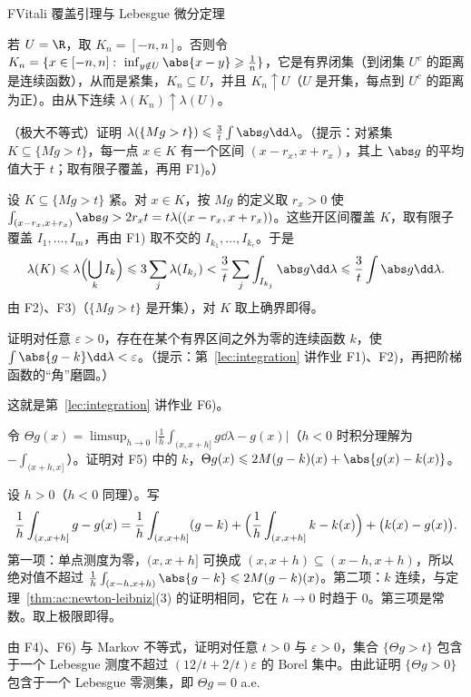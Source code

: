 \begin{probleme}{F}{Vitali 覆盖引理与 Lebesgue 微分定理}
\begin{questions}
\begin{solution}
若 $U=\R$，取 $K_n=[-n,n]$。否则令 $K_n=\{x\in[-n,n]:\ \inf_{y\notin U}\abs{x-y}\geqslant\frac1n\}$，它是有界闭集（到闭集 $U^c$ 的距离是连续函数），从而是紧集，$K_n\subseteq U$，并且 $K_n\uparrow U$（$U$ 是开集，每点到 $U^c$ 的距离为正）。由从下连续 $\lambda(K_n)\uparrow\lambda(U)$。
\end{solution}
\item （极大不等式）证明 $\lambda(\{Mg>t\})\leqslant\frac3t\int\abs g\dd\lambda$。（提示：对紧集 $K\subseteq\{Mg>t\}$，每一点 $x\in K$ 有一个区间 $(x-r_x,x+r_x)$，其上 $\abs g$ 的平均值大于 $t$；取有限子覆盖，再用 F1)。）
\begin{solution}
设 $K\subseteq\{Mg>t\}$ 紧。对 $x\in K$，按 $Mg$ 的定义取 $r_x>0$ 使 $\int_{(x-r_x,x+r_x)}\abs g>2r_xt=t\lambda((x-r_x,x+r_x))$。这些开区间覆盖 $K$，取有限子覆盖 $I_1,\dots,I_m$，再由 F1) 取不交的 $I_{k_1},\dots,I_{k_r}$。于是
\[
\lambda(K)\leqslant\lambda\Bigl(\bigcup_kI_k\Bigr)\leqslant3\sum_j\lambda(I_{k_j})<\frac3t\sum_j\int_{I_{k_j}}\abs g\dd\lambda\leqslant\frac3t\int\abs g\dd\lambda .
\]
由 F2)、F3)（$\{Mg>t\}$ 是开集），对 $K$ 取上确界即得。
\end{solution}
\item 证明对任意 $\varepsilon>0$，存在在某个有界区间之外为零的连续函数 $k$，使 $\int\abs{g-k}\dd\lambda<\varepsilon$。（提示：第~\ref{lec:integration} 讲作业 F1)、F2)，再把阶梯函数的“角”磨圆。）
\begin{solution}
这就是第~\ref{lec:integration} 讲作业 F6)。
\end{solution}
\item 令 $\Theta g(x)=\limsup_{h\to0}\bigl|\frac1h\int_{(x,x+h]}g\dd\lambda-g(x)\bigr|$（$h<0$ 时积分理解为 $-\int_{(x+h,x]}$）。证明对 F5) 中的 $k$，$\Theta g(x)\leqslant2M(g-k)(x)+\abs{g(x)-k(x)}$。
\begin{solution}
设 $h>0$（$h<0$ 同理）。写
\[
\frac1h\int_{(x,x+h]}g-g(x)=\frac1h\int_{(x,x+h]}(g-k)+\Bigl(\frac1h\int_{(x,x+h]}k-k(x)\Bigr)+\bigl(k(x)-g(x)\bigr).
\]
第一项：单点测度为零，$(x,x+h]$ 可换成 $(x,x+h)\subseteq(x-h,x+h)$，所以绝对值不超过 $\frac1h\int_{(x-h,x+h)}\abs{g-k}\leqslant2M(g-k)(x)$。第二项：$k$ 连续，与定理~\ref{thm:ac:newton-leibniz}(3) 的证明相同，它在 $h\to0$ 时趋于 $0$。第三项是常数。取上极限即得。
\end{solution}
\item 由 F4)、F6) 与 Markov 不等式，证明对任意 $t>0$ 与 $\varepsilon>0$，集合 $\{\Theta g>t\}$ 包含于一个 Lebesgue 测度不超过 $(12/t+2/t)\varepsilon$ 的 Borel 集中。由此证明 $\{\Theta g>0\}$ 包含于一个 Lebesgue 零测集，即 $\Theta g=0$ a.e.

\end{questions}
\end{probleme}
